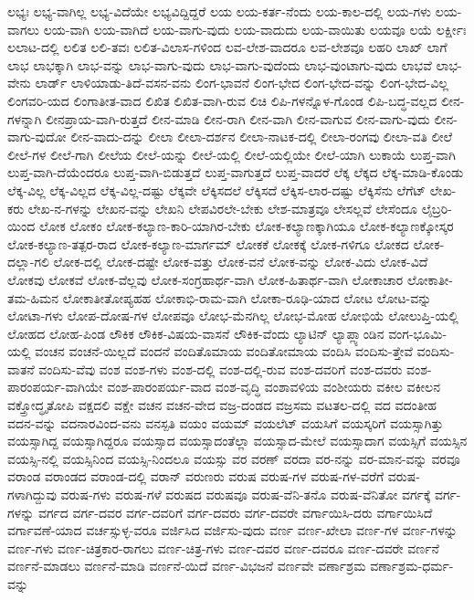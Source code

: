 {ಲಭ್ಯಃ
ಲಭ್ಯ-ವಾಗಿಲ್ಲ
ಲಭ್ಯ-ವಿದೆಯೇ
ಲಭ್ಯವಿದ್ದಿದ್ದರೆ
ಲಯ
ಲಯ-ಕರ್ತ-ನೆಂದು
ಲಯ-ಕಾಲ-ದಲ್ಲಿ
ಲಯ-ಗಳು
ಲಯ-ವಾಗಲು
ಲಯ-ವಾಗಿ
ಲಯ-ವಾಗಿದೆ
ಲಯ-ವಾಗು-ವುದು
ಲಯ-ವಾದುದು
ಲಯ-ವಾಯಿತು
ಲಯವೂ
ಲಯೆ
ಲರ್ಕ್ಷೀಃ
ಲಲಾಟ-ದಲ್ಲಿ
ಲಲಿತ
ಲಲಿ-ತವಃ
ಲಲಿತ-ವಿಲಾಸ-ಗಳಿಂದ
ಲವ-ಲೇಶ-ವಾದರೂ
ಲವ-ಲೇಶವೂ
ಲಹರಿ
ಲಾಖ್
ಲಾಗೆ
ಲಾಭ
ಲಾಭಕ್ಕಾಗಿ
ಲಾಭ-ವನ್ನು
ಲಾಭ-ವಾಗು-ವುದು
ಲಾಭ-ವಾಗು-ವುದೆಂದು
ಲಾಭ-ವುಂಟಾಗು-ವುದು
ಲಾಭವೆ
ಲಾಭ-ವೇನು
ಲಾರ್ಡ್
ಲಾಳಿಯಾಡು-ತಿದೆ-ವಸನ-ವನು
ಲಿಂಗ-ಭಾವನೆ
ಲಿಂಗ-ಭೇದ
ಲಿಂಗ-ಭೇದ-ವನ್ನು
ಲಿಂಗ-ಭೇದ-ವಿಲ್ಲ
ಲಿಂಗವರಿ-ಯದ
ಲಿಂಗಾತೀತ-ವಾದ
ಲಿಖಿತ
ಲಿಖಿತ-ವಾಗಿ-ರುವ
ಲಿಚಿ
ಲಿಪಿ-ಗಳನ್ನೊಳ-ಗೊಂಡ
ಲಿಪಿ-ಬದ್ಧ-ವಲ್ಲದ
ಲೀನ-ಗಳನ್ನಾಗಿ
ಲೀನಪ್ರಾಯ-ವಾಗಿ-ರುತ್ತದೆ
ಲೀನ-ಮಾಡಿ
ಲೀನ-ರಾಗಿ
ಲೀನ-ವಾಗಿ
ಲೀನ-ವಾಗುವ
ಲೀನ-ವಾಗು-ವುದು
ಲೀನ-ವಾಗು-ವುದೋ
ಲೀನ-ವಾದು-ದನ್ನು
ಲೀಲಾ
ಲೀಲಾ-ದರ್ಶನ
ಲೀಲಾ-ನಾಟಕ-ದಲ್ಲಿ
ಲೀಲಾ-ರಂಗವು
ಲೀಲಾ-ವತಿ
ಲೀಲೆ
ಲೀಲೆ-ಗಳ
ಲೀಲೆ-ಗಾಗಿ
ಲೀಲೆಯ
ಲೀಲೆ-ಯನ್ನು
ಲೀಲೆ-ಯಲ್ಲಿ
ಲೀಲೆ-ಯಲ್ಲಿಯೇ
ಲೀಲೆ-ಯಾಗಿ
ಲುಕಾಯೆ
ಲುಪ್ತ-ವಾಗಿ
ಲುಪ್ತ-ವಾಗಿ-ದೆಯೆಂದರೂ
ಲುಪ್ತ-ವಾಗಿ-ಬಿಡುತ್ತದೆ
ಲುಪ್ತ-ವಾಗುತ್ತದೆ
ಲುಪ್ತ-ವಾದರೆ
ಲೆಕ್ಕ
ಲೆಕ್ಕದ
ಲೆಕ್ಕ-ಮಾಡಿ-ಕೊಂಡು
ಲೆಕ್ಕ-ವಿಲ್ಲ
ಲೆಕ್ಕ-ವಿಲ್ಲದ
ಲೆಕ್ಕ-ವಿಲ್ಲ-ದಷ್ಟು
ಲೆಕ್ಕವೇ
ಲೆಕ್ಕಿಸದಲೆ
ಲೆಕ್ಕಿಸದೆ
ಲೆಕ್ಕಿಸ-ಲಾರ-ದಷ್ಟು
ಲೆಕ್ಕಿಸೆನು
ಲೆಗೆಟ್
ಲೇಖ-ಕರು
ಲೇಖ-ನ-ಗಳನ್ನು
ಲೇಖನ-ವನ್ನು
ಲೇಖನಿ
ಲೇಪವಿರಲೇ-ಬೇಕು
ಲೇಶ-ಮಾತ್ರವೂ
ಲೇಸಲ್ಲವೆ
ಲೇಸೆಂದೂ
ಲೈಬ್ರರಿ-ಯಿಂದ
ಲೋಕ
ಲೋಕಂ
ಲೋಕ-ಕಲ್ಯಾಣ-ಕಾರಿ-ಯಾಗಿರ-ಬೇಕು
ಲೋಕ-ಕಲ್ಯಾಣಕ್ಕಾಗಿಯೂ
ಲೋಕ-ಕಲ್ಯಾಣಕ್ಕೋಸ್ಕರ
ಲೋಕ-ಕಲ್ಯಾಣ-ತತ್ಪರ-ರಾದ
ಲೋಕ-ಕಲ್ಯಾಣ-ಮಾರ್ಗಮ್
ಲೋಕಕೆ
ಲೋಕಕ್ಕೆ
ಲೋಕ-ಗಳಿಗೂ
ಲೋಕದ
ಲೋಕ-ದಲ್ಲಾ-ಗಲಿ
ಲೋಕ-ದಲ್ಲಿ
ಲೋಕ-ದಷ್ಟೇ
ಲೋಕ-ವತ್ತು
ಲೋಕ-ವನೆ
ಲೋಕ-ವನ್ನು
ಲೋಕ-ವಿದು
ಲೋಕ-ವಿದೆ
ಲೋಕವು
ಲೋಕವೆ
ಲೋಕ-ವೆಲ್ಲವು
ಲೋಕ-ಸಂಗ್ರಹಾರ್ಥ-ವಾಗಿ
ಲೋಕ-ಹಿತಾರ್ಥ-ವಾಗಿ
ಲೋಕಾಚಾರ
ಲೋಕಾತೀ-ತಮ-ಹಿಮನ
ಲೋಕಾತೀತೋಪ್ಯಹಹ
ಲೋಕಾಭಿ-ರಾಮ-ವಾಗಿ
ಲೋಕಾ-ರೂಢಿ-ಯಾದ
ಲೋಟ
ಲೋಟ-ವನ್ನು
ಲೋಟಾ-ಗಳು
ಲೋಪ-ದೋಷ-ಗಳ
ಲೋಪವೂ
ಲೋಭ-ಮೆನಗಿಲ್ಲ
ಲೋಭ-ಮೋಹ
ಲೋಭಿಯೆ
ಲೋಲುಪ್ತಿ-ಯಲ್ಲಿ
ಲೋಹದ
ಲೋಹ-ಪಿಂಡ
ಲೌಕಿಕ
ಲೌಕಿಕ-ವಿಷಯ-ವಾಸನೆ
ಲೌಕಿಕ-ವೆಂದು
ಲ್ಯಾಟಿನ್
ಲ್ಯಾಪ್ಲ್ಯಾಂಡಿನ
ವಂಗ-ಭೂಮಿ-ಯಲ್ಲಿ
ವಂಚನ
ವಂಚನೆ-ಯಿಲ್ಲದೆ
ವಂದನೆ
ವಂದಿತೊಮಾಯ
ವಂದಿತೋಮಾಯ
ವಂದಿಸಿ
ವಂದಿಸು-ತ್ತೇವೆ
ವಂದಿಸು-ವಾತನೆ
ವಂದಿಸು-ವೆವು
ವಂಶ
ವಂಶ-ಗಳು
ವಂಶ-ದಲ್ಲಿ
ವಂಶ-ದಲ್ಲಿ-ರುವ
ವಂಶ-ದವರಿಗೆ
ವಂಶ-ದವರು
ವಂಶ-ಪಾರಂಪರ್ಯ-ವಾಗಿಯೇ
ವಂಶ-ಪಾರಂಪರ್ಯ-ವಾದ
ವಂಶ-ವೃದ್ಧಿ
ವಂಶಾವಳಿಯ
ವಂಶೀಯರು
ವಕೀಲ
ವಕೀಲನ
ವಕ್ತ್ರೋದ್ಧೃತೋಪಿ
ವಕ್ಷದಲಿ
ವಕ್ಷೇ
ವಚನ
ವಚನ-ವೇದ
ವಜ್ರ-ದಂಡದ
ವಜ್ರಸಮ
ವಟತಲ-ದಲ್ಲಿ
ವದ
ವದಂತೀಹ
ವದನ-ವನ್ನು
ವದನಾರವಿಂದ-ವನು
ವನಸ್ಪತಿ
ವಯಂ
ವಯಮ್
ವಯಲೆಟ್
ವಯಸಿಗೆ
ವಯಸ್ಕರಿಗೆ
ವಯಸ್ಸಾಗಿತ್ತು
ವಯಸ್ಸಾಗಿದ್ದ
ವಯಸ್ಸಾಗಿದ್ದರೂ
ವಯಸ್ಸಾದ
ವಯಸ್ಸಾದಂತೆಲ್ಲಾ
ವಯಸ್ಸಾದ-ಮೇಲೆ
ವಯಸ್ಸಾದಾಗ
ವಯಸ್ಸಿಗೆ
ವಯಸ್ಸಿನ
ವಯಸ್ಸಿ-ನಲ್ಲಿ
ವಯಸ್ಸಿನಿಂದ
ವಯಸ್ಸಿ-ನಿಂದಲೂ
ವಯಸ್ಸು
ವರ
ವರಣ್
ವರದಾ
ವರ-ನನ್ನು
ವರ-ಮಾನ-ವನ್ನು
ವರವೂ
ವರಾಂಡ
ವರಾಂಡದ
ವರಾಂಡ-ದಲ್ಲಿ
ವರಾನ್
ವರುಣರು
ವರುಷ
ವರುಷ-ಗಳ
ವರುಷ-ಗಳ-ವರೆಗೆ
ವರುಷ-ಗಳಾಗಿದ್ದುವು
ವರುಷ-ಗಳು
ವರುಷ-ಗಳೆ
ವರುಷದ
ವರುಷವೂ
ವರುಷ-ವೆನಿ-ತನೊ
ವರುಷ-ವೆನಿತೋ
ವರ್ಗಕ್ಕೆ
ವರ್ಗ-ಗಳನ್ನು
ವರ್ಗದ
ವರ್ಗ-ದವರ
ವರ್ಗ-ದವರಿಗೆ
ವರ್ಗ-ದವರು
ವರ್ಗ-ದವರೇ
ವರ್ಗಾಯಿಸಿ-ದರು
ವರ್ಗಾಯಿಸಿದೆ
ವರ್ಗಾವಣೆ-ಯಾದ
ವರ್ಚಸ್ಸುಳ್ಳ-ವರೂ
ವರ್ಜಿಸಿದ
ವರ್ಜಿಸು-ವುದು
ವರ್ಣ
ವರ್ಣ-ಖೇಲಾ
ವರ್ಣ-ಗಳ
ವರ್ಣ-ಗಳನ್ನು
ವರ್ಣ-ಗಳು
ವರ್ಣ-ಚಿತ್ರಕಾರ-ರಾಗಲು
ವರ್ಣ-ಚಿತ್ರ-ಗಳು
ವರ್ಣ-ದವರ
ವರ್ಣ-ದವರೂ
ವರ್ಣ-ದವರೇ
ವರ್ಣನೆ
ವರ್ಣನೆ-ಮಾಡಲು
ವರ್ಣನೆ-ಮಾಡಿ
ವರ್ಣನೆ-ಯಿದೆ
ವರ್ಣ-ವಿಭಜನೆ
ವರ್ಣವೇ
ವರ್ಣಾಶ್ರಮ
ವರ್ಣಾಶ್ರಮ-ಧರ್ಮ-ವನ್ನು
}
